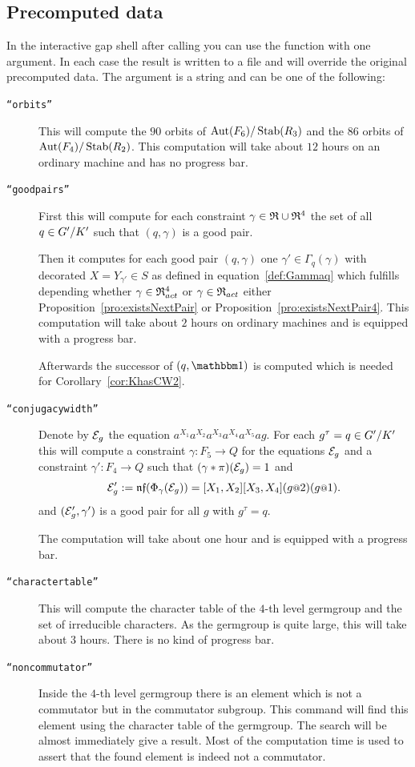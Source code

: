 \documentclass[a4paper,11pt]{amsart}
\begin{document}
\subsection{Precomputed data}\label{sec:precomputation}
In the interactive gap shell after calling 
you can use the function  with one argument. In each case
the result is written to a file and will override the original precomputed data. The 
argument is a string and can be one of the following:
\begin{description}
    \item [\texttt{``orbits''}] This will compute the $90$ orbits of ${\operatorname{{Aut}}(F_6)/\operatorname{Stab}(R_3)}$ and the
		       $86$ orbits of ${\operatorname{{Aut}}(F_4)/\operatorname{Stab}(R_2)}$. This computation will take
		       about $12$ hours on an ordinary machine and has no progress bar.
   \item [\texttt{``goodpairs''}] First this will compute for each constraint $\gamma\in\mathfrak{R}\cup\mathfrak{R}^4$ 
		      the set of all $q\in{G'/K'}$ such that $(q,\gamma)$ is a good pair.
		      
		      Then it computes for each good pair $(q,\gamma)$ one $\gamma'\in\Gamma_q(\gamma)$
		      with decorated $X=Y_{\gamma'}\in S$ as defined in equation~\ref{def:Gammaq} which 
		      fulfills depending whether $\gamma\in\mathfrak{R}^4_{act}$ or $\gamma\in\mathfrak{R}_{act}$ 
		      either Proposition~\ref{pro:existsNextPair} or Proposition~\ref{pro:existsNextPair4}.
		      This computation will take about $2$ hours on ordinary machines and is equipped 
		      with a progress bar. 
		      
		      Afterwards the successor of $(q,\id)$ is computed which is needed for 
		      Corollary~\ref{cor:KhasCW2}. 
   \item [\texttt{``conjugacywidth''}] Denote by $\mathcal{E}_g$ the equation $a^{X_1}a^{X_2}a^{X_3}a^{X_4}a^{X_5}ag$.
		      For each $g^\tau=q\in{G'/K'}$ this will compute a constraint 
		      $\gamma\colon F_5 \to Q$ for the equations $\mathcal{E}_g$
		      and a constraint $\gamma'\colon F_4\to Q$ such that
		      $(\gamma * \pi)(\mathcal{E}_g) = 1$ and 
		      \[\eq{E}'_g := \nf(\Phi_\gamma(\eq{E}_g))=[X_1,X_2][X_3,X_4](g\at{2})(g\at{1}).\] and
		      $(\mathcal{E}'_g,\gamma')$ is a good pair for all $g$ with $g^\tau=q$.
		      
		      The computation will take about one hour and is equipped with a progress bar.
   \item [\texttt{``charactertable''}] This will compute the character table of the $4$-th level germgroup
		      and the set of irreducible characters. 
		      As the germgroup is quite large, this
		      will take about $3$ hours. There is no kind of progress bar.
   \item [\texttt{``noncommutator''}] Inside the $4$-th level germgroup there is an element which is not
		      a commutator but in the commutator subgroup. This command will find this 
		      element using the character table of the germgroup. The search will be 
		      almost immediately give a result. Most of the computation time is used
		      to assert that the found element is indeed not a commutator.
		      

\end{description}
\end{document}
